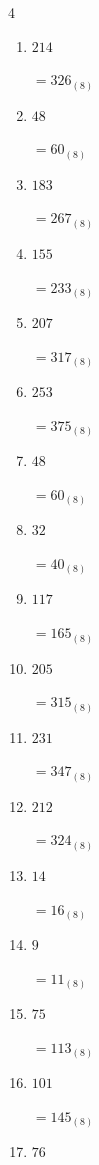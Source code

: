 \begin{multicols}{4}
\begin{enumerate}
  \item $214$

        $=326_{(8)}$

  \item $48$

        $=60_{(8)}$

  \item $183$

        $=267_{(8)}$

  \item $155$

        $=233_{(8)}$

  \item $207$

        $=317_{(8)}$

  \item $253$

        $=375_{(8)}$

  \item $48$

        $=60_{(8)}$

  \item $32$

        $=40_{(8)}$

  \item $117$

        $=165_{(8)}$

  \item $205$

        $=315_{(8)}$

  \item $231$

        $=347_{(8)}$

  \item $212$

        $=324_{(8)}$

\columnbreak %

  \item $14$

        $=16_{(8)}$

  \item $9$

        $=11_{(8)}$

  \item $75$

        $=113_{(8)}$

  \item $101$

        $=145_{(8)}$

  \item $76$


\end{enumerate}
\end{multicols}
